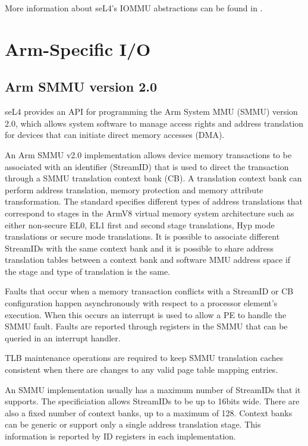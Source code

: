 More information about seL4's IOMMU abstractions can be found in \cite{Palande:M}.
\fi

\section{Arm-Specific I/O}

\subsection{Arm SMMU version 2.0}
\label{sec:smmuv2}


seL4 provides an API for programming the Arm System MMU (SMMU) version 2.0,
which allows system software to manage access rights and address translation for
devices that can initiate direct memory accesses (DMA).

An Arm SMMU v2.0 implementation allows device memory transactions to be associated
with an identifier (StreamID) that is used to direct the transaction through a
SMMU translation context bank (CB). A translation context bank can perform
address translation, memory protection and memory attribute transformation.
The standard specifies different types of address translations that correspond
to stages in the ArmV8 virtual memory system architecture such as either
non-secure  EL0, EL1 first and second stage translations, Hyp mode translations
or secure mode translations. It is possible to associate different StreamIDs
with the same context bank and it is possible to share address translation
tables between a context bank and software MMU address space if the stage and type
of translation is the same.

Faults that occur when a memory transaction conflicts with a StreamID or CB
configuration happen asynchronously with respect to a processor element's
execution. When this occurs an interrupt is used to allow a PE to handle the
SMMU fault. Faults are reported through registers in the SMMU that can be
queried in an interrupt handler.

TLB maintenance operations are required to keep SMMU translation caches
consistent when there are changes to any valid page table mapping entries.

An SMMU implementation usually has a maximum number of StreamIDs that it supports.
The specificiation allows StreamIDs to be up to 16bits wide. There are also a
fixed number of context banks, up to a maximum of 128. Context banks can
be generic or support only a single address translation stage. This information
is reported by ID registers in each implementation.

